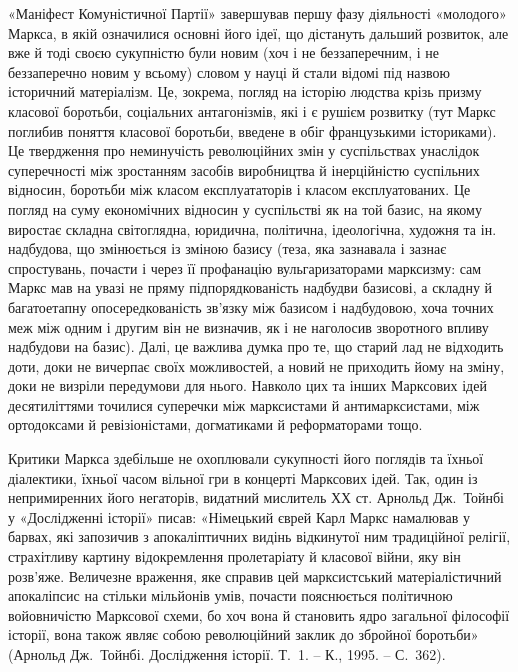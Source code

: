 «Маніфест Комуністичної Партії» завершував першу фазу діяльності 
«молодого» Маркса, в якій означилися основні його ідеї, що дістануть 
дальший розвиток, але вже й тоді своєю сукупністю були новим (хоч і не 
беззаперечним, і не беззаперечно новим у всьому) словом у науці й стали 
відомі під назвою історичний матеріалізм. Це, зокрема, погляд на 
історію людства крізь призму класової боротьби, соціальних 
антагонізмів, які і є рушієм розвитку (тут Маркс поглибив поняття 
класової боротьби, введене в обіг французькими істориками). Це 
твердження про неминучість революційних змін у суспільствах 
унаслідок суперечності між зростанням засобів виробництва й 
інерційністю суспільних відносин, боротьби між класом експлуататорів 
і класом експлуатованих. Це погляд на суму економічних відносин у 
суспільстві як на той базис, на якому виростає складна світоглядна, 
юридична, політична, ідеологічна, художня та ін. надбудова, що 
змінюється із зміною базису (теза, яка зазнавала і зазнає спростувань, 
почасти і через її профанацію вульгаризаторами марксизму: сам Маркс 
мав на увазі не пряму підпорядкованість надбудви базисові, а складну й 
багатоетапну опосередкованість зв'язку між базисом і надбудовою, хоча 
точних меж між одним і другим він не визначив, як і не наголосив 
зворотного впливу надбудови на базис). Далі, це важлива думка про те, що 
старий лад не відходить доти, доки не вичерпає своїх можливостей, а 
новий не приходить йому на зміну, доки не визріли передумови для нього. 
Навколо цих та інших Марксових ідей десятиліттями точилися суперечки 
між марксистами й антимарксистами, між ортодоксами й ревізіоністами, 
догматиками й реформаторами тощо.


Критики Маркса здебільше не охоплювали сукупності його поглядів та 
їхньої діалектики, їхньої часом вільної гри в концерті Марксових ідей. 
Так, один із непримиренних його негаторів, видатний мислитель ХХ ст. 
Арнольд Дж.~Тойнбі у «Дослідженні історії» писав: «Німецький єврей 
Карл Маркс намалював у барвах, які запозичив з 
апокаліптичних видінь відкинутої ним традиційної релігії, 
страхітливу картину відокремлення пролетаріату й класової війни, яку 
він розв'яже. Величезне враження, яке справив цей марксистський 
матеріалістичний апокаліпсис на стільки мільйонів умів, почасти 
пояснюється політичною войовничістю Марксової схеми, бо хоч вона й 
становить ядро загальної філософії історії, вона також являє собою 
революційний заклик до збройної боротьби» (Арнольд Дж.~Тойнбі. 
Дослідження історії. Т.~1. -- К., 1995. -- С.~362). 



